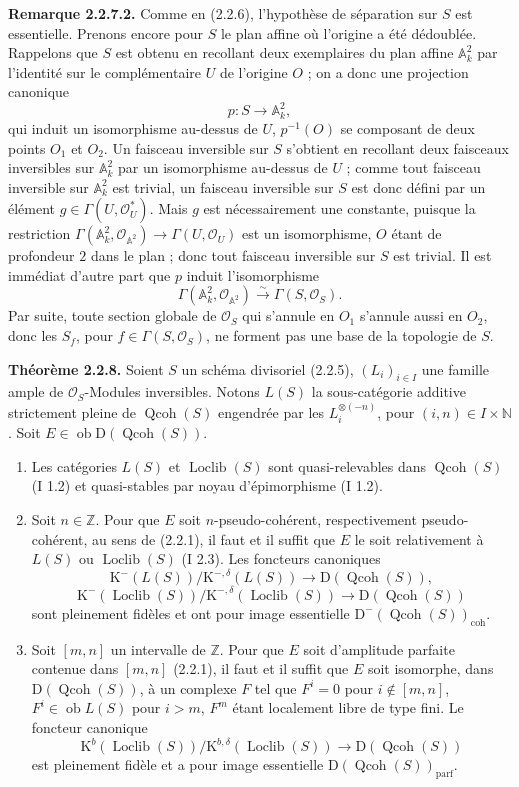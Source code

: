 \documentclass[11pt]{article}
\providecommand{\Loclib}{\operatorname{Loclib}}
\providecommand{\Qcoh}{\operatorname{Qcoh}}
\providecommand{\Ob}{\operatorname{ob}}
\providecommand{\coh}{\operatorname{coh}}
\providecommand{\parf}{\operatorname{parf}}
\begin{document}
\textbf{Remarque 2.2.7.2.} Comme en (2.2.6), l'hypothèse de séparation sur $S$ est essentielle. Prenons encore pour $S$ le plan affine où l'origine a été dédoublée. Rappelons que $S$ est obtenu en recollant deux exemplaires du plan affine $\mathbb A^2_k$ par l'identité sur le complémentaire $U$ de l'origine $O$ ; on a donc une projection canonique
\[
p:S\longrightarrow\mathbb A^2_k,
\]
qui induit un isomorphisme au-dessus de $U$, $p^{-1}(O)$ se composant de deux points $O_1$ et $O_2$. Un faisceau inversible sur $S$ s'obtient en recollant deux faisceaux inversibles sur $\mathbb A^2_k$ par un isomorphisme au-dessus de $U$ ; comme tout faisceau inversible sur $\mathbb A^2_k$ est trivial, un faisceau inversible sur $S$ est donc défini par un élément $g\in\Gamma(U,\mathcal O_U^*)$. Mais $g$ est nécessairement une constante, puisque la restriction $\Gamma(\mathbb A^2_k,\mathcal O_{\mathbb A^2})\to\Gamma(U,\mathcal O_U)$ est un isomorphisme, $O$ étant de profondeur $2$ dans le plan ; donc tout faisceau inversible sur $S$ est trivial. Il est immédiat d'autre part que $p$ induit l'isomorphisme
\[
\Gamma(\mathbb A^2_k,\mathcal O_{\mathbb A^2})\xrightarrow{\sim}\Gamma(S,\mathcal O_S).
\]
Par suite, toute section globale de $\mathcal O_S$ qui s'annule en $O_1$ s'annule aussi en $O_2$, donc les $S_f$, pour $f\in\Gamma(S,\mathcal O_S)$, ne forment pas une base de la topologie de $S$.

\textbf{Théorème 2.2.8.} Soient $S$ un schéma divisoriel (2.2.5), $(L_i)_{i\in I}$ une famille ample de $\mathcal O_S$-Modules inversibles. Notons $L(S)$ la sous-catégorie additive strictement pleine de $\Qcoh(S)$ engendrée par les $L_i^{\otimes(-n)}$, pour $(i,n)\in I\times\mathbb N$. Soit $E\in\Ob\mathrm D(\Qcoh(S))$.
\begin{enumerate}[label=\alph*)]
\item Les catégories $L(S)$ et $\Loclib(S)$ sont quasi-relevables dans $\Qcoh(S)$ (I 1.2) et quasi-stables par noyau d'épimorphisme (I 1.2).
\item Soit $n\in\mathbb Z$. Pour que $E$ soit $n$-pseudo-cohérent, respectivement pseudo-cohérent, au sens de (2.2.1), il faut et il suffit que $E$ le soit relativement à $L(S)$ ou $\Loclib(S)$ (I 2.3). Les foncteurs canoniques
\[
\mathrm K^{-}(L(S))/\mathrm K^{-,\delta}(L(S))\longrightarrow \mathrm D(\Qcoh(S)),
\]
\[
\mathrm K^{-}(\Loclib(S))/\mathrm K^{-,\delta}(\Loclib(S))\longrightarrow \mathrm D(\Qcoh(S))
\]
sont pleinement fidèles et ont pour image essentielle $\mathrm D^{-}(\Qcoh(S))_{\coh}$.
\item Soit $[m,n]$ un intervalle de $\mathbb Z$. Pour que $E$ soit d'amplitude parfaite contenue dans $[m,n]$ (2.2.1), il faut et il suffit que $E$ soit isomorphe, dans $\mathrm D(\Qcoh(S))$, à un complexe $F$ tel que $F^i=0$ pour $i\notin[m,n]$, $F^i\in\Ob L(S)$ pour $i>m$, $F^m$ étant localement libre de type fini. Le foncteur canonique
\[
\mathrm K^b(\Loclib(S))/\mathrm K^{b,\delta}(\Loclib(S))\longrightarrow \mathrm D(\Qcoh(S))
\]
est pleinement fidèle et a pour image essentielle $\mathrm D(\Qcoh(S))_{\parf}$.
\end{enumerate}
\end{document}
